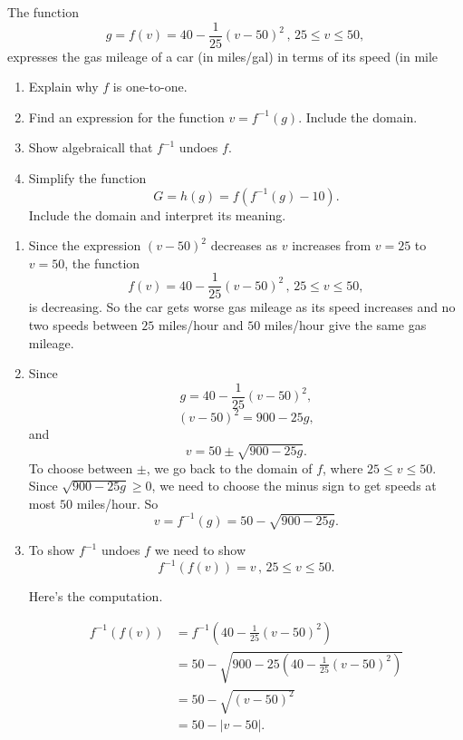 \documentclass{ximera}
\begin{document}
\begin{example} \label{Emv3et3}
The function
\[
g = f(v) = 40 -\frac{1}{25}\left(v-50 \right)^2 \, , \, 25\leq v \leq 50, 
\]
expresses the gas mileage of a car (in miles/gal) in terms of its speed (in mile

\begin{enumerate}
\item Explain why $f$ is one-to-one.
\item Find an expression for the function $v=f^{-1}(g)$. Include the domain.
     \item Show algebraicall that $f^{-1}$ undoes $f$.
    \item Simplify the function
    \[
             G =h(g)= f(f^{-1}(g)-10).
    \]
    Include the domain and interpret its meaning.
    \end{enumerate}

\begin{explanation}
\begin{enumerate}
\item Since the expression $(v-50)^2$ decreases as $v$ increases from $v=25$ to $v=50$, the function 
\[
 f(v) = 40 -\frac{1}{25}\left(v-50 \right)^2 \, , \, 25\leq v \leq 50,
\]
is decreasing. So the car gets worse gas mileage as its speed increases and no two speeds between $25$ miles/hour and $50$ miles/hour give the same gas mileage. 


\item Since 
\[
  g =  40 -\frac{1}{25}\left(v-50 \right)^2 ,
\]
\[
  (v-50)^2 = 900 - 25g ,
\]
and
\[
 v  = 50 \pm \sqrt{900-25g} .
\]
To choose between $\pm$, we go back to the domain of $f$, where $25 \leq v \leq 50$. Since $\sqrt{900-25g}\geq 0$, we need to choose the minus sign to get speeds at most $50$ miles/hour. So
\[
 v = f^{-1}(g) = 50 - \sqrt{900-25g}.
\]

\item To show $f^{-1}$ undoes $f$ we need to show
\[
   f^{-1}(f(v)) = v \, , \, 25\leq v \leq 50.
\]

Here's the computation.

\begin{align*}
   f^{-1}(f(v)) &= f^{-1}\left(  40 -\frac{1}{25}\left(v-50 \right)^2 \right) \\ 
                     &= 50 - \sqrt{900 - 25 \left( 40 -\frac{1}{25}\left(v-50 \right)^2 \right)} \\ 
                     &= 50 - \sqrt{(v-50)^2} \\
                     &= 50 - \left| v-50 \right| .
\end{align*}


\end{enumerate}
\end{explanation}
\end{example}
\end{document}
